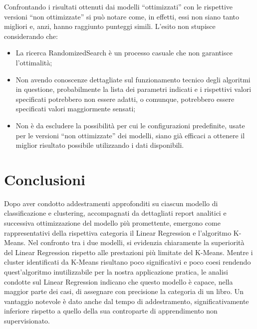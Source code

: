 \documentclass[12pt,oneside]{article}
\begin{document}
        \begin{justify}
        Confrontando i risultati ottenuti dai modelli “ottimizzati” con le rispettive versioni “non ottimizzate” si può notare come, in effetti, essi non siano tanto migliori e, anzi, hanno raggiunto punteggi simili. L'esito non stupisce considerando che: 
        \begin{itemize}
            \item La ricerca RandomizedSearch è un processo casuale che non garantisce l’ottimalità;
            \item Non avendo conoscenze dettagliate sul funzionamento tecnico degli algoritmi in questione, probabilmente la lista dei parametri indicati e i rispettivi valori specificati potrebbero non essere adatti, o comunque, potrebbero essere specificati valori maggiormente sensati;
            \item Non è da escludere la possibilità per cui le configurazioni predefinite, usate per le versioni “non ottimizzate” dei modelli, siano già efficaci a ottenere il miglior risultato possibile utilizzando i dati disponibili.
        \end{itemize}
    \end{justify}

    \section{Conclusioni}
    \begin{justify}
        Dopo aver condotto addestramenti approfonditi su ciascun modello di classificazione e clustering, accompagnati da dettagliati report analitici e successiva ottimizzazione del modello più promettente, emergono come rappresentativi della rispettiva categoria il Linear Regression e l'algoritmo K-Means.
        Nel confronto tra i due modelli, si evidenzia chiaramente la superiorità del Linear Regression rispetto alle prestazioni più limitate del K-Means. 
        Mentre i cluster identificati da K-Means risultano poco significativi e poco coesi rendendo quest'algoritmo inutilizzabile per la nostra applicazione pratica, le analisi condotte sul Linear Regression indicano che questo modello è capace, nella maggior parte dei casi, di assegnare con precisione la categoria di un libro. Un vantaggio notevole è dato anche dal tempo di addestramento, significativamente inferiore rispetto a quello della sua controparte di apprendimento non supervisionato.
        \end{justify}
\end{document}

